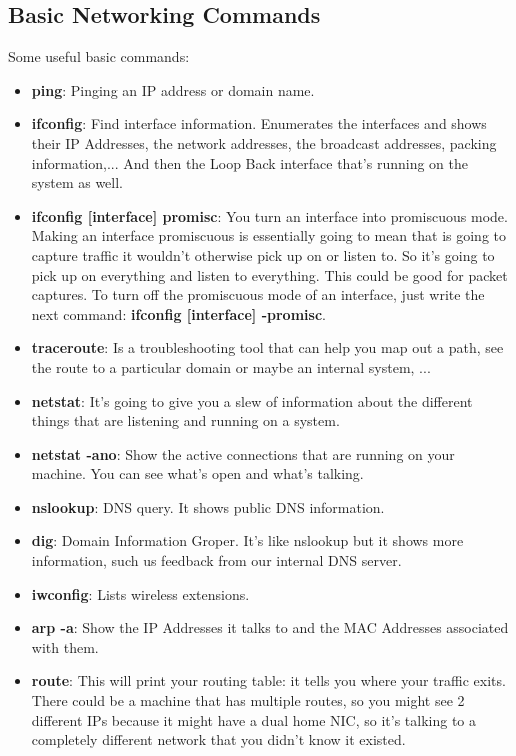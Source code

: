 \documentclass[11pt,a4paper]{article}
\begin{document}
\subsection{Basic Networking Commands}
Some useful basic commands:
\begin{itemize}
\item \textbf{ping}: Pinging an IP address or domain name.
\item \textbf{ifconfig}: Find interface information. Enumerates the interfaces and shows their IP Addresses, the network addresses, the broadcast addresses, packing information,... And then the Loop Back interface that's running on the system as well.
\item \textbf{ifconfig [interface] promisc}: You turn an interface into promiscuous mode. Making an interface promiscuous is essentially going to mean that is going to capture traffic it wouldn't otherwise pick up on or listen to. So it's going to pick up on everything and listen to everything. This could be good for packet captures. To turn off the promiscuous mode of an interface, just write the next command: \textbf{ifconfig [interface] -promisc}.
\item \textbf{traceroute}: Is a troubleshooting tool that can help you map out a path, see the route to a particular domain or maybe an internal system, ...
\item \textbf{netstat}: It's going to give you a slew of information about the different things that are listening and running on a system.
\item \textbf{netstat -ano}: Show the active connections that are running on your machine. You can see what's open and what's talking.
\item \textbf{nslookup}: DNS query. It shows public DNS information.
\item \textbf{dig}: Domain Information Groper. It's like nslookup but it shows more information, such us feedback from  our internal DNS server.
\item \textbf{iwconfig}: Lists wireless extensions.
\item \textbf{arp -a}: Show the IP Addresses it talks to and the MAC Addresses associated with them.
\item \textbf{route}: This will print your routing table: it tells you where your traffic exits. There could be a machine that has multiple routes, so you might see 2 different IPs because it might have a dual home NIC, so it's talking to a completely different network that you didn't know it existed.
\end{itemize}
\end{document}
